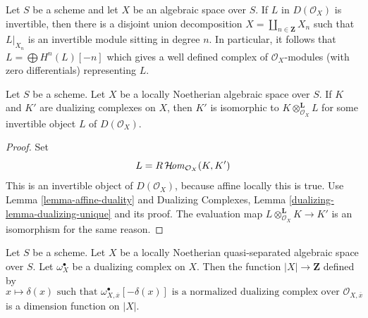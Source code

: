 \medskip\noindent
Let $S$ be a scheme and let $X$ be an algebraic space over $S$.
If $L$ in $D(\mathcal{O}_X)$ is invertible, then there is a
disjoint union decomposition $X = \coprod_{n \in \mathbf{Z}} X_n$
such that $L|_{X_n}$ is an invertible module sitting in degree $n$.
In particular, it follows that $L = \bigoplus H^n(L)[-n]$
which gives a well defined complex of $\mathcal{O}_X$-modules
(with zero differentials) representing $L$.

\begin{lemma}
\label{lemma-dualizing-unique-spaces}
Let $S$ be a scheme.
Let $X$ be a locally Noetherian algebraic space over $S$.
If $K$ and $K'$ are dualizing complexes on $X$, then $K'$
is isomorphic to $K \otimes_{\mathcal{O}_X}^\mathbf{L} L$
for some invertible object $L$ of $D(\mathcal{O}_X)$.
\end{lemma}

\begin{proof}
Set
$$
L = R\mathop{\mathcal{H}\!\mathit{om}}\nolimits_{\mathcal{O}_X}(K, K')
$$
This is an invertible object of $D(\mathcal{O}_X)$, because affine locally
this is true. Use Lemma \ref{lemma-affine-duality} and
Dualizing Complexes, Lemma
\ref{dualizing-lemma-dualizing-unique} and its proof.
The evaluation map $L \otimes_{\mathcal{O}_X}^\mathbf{L} K \to K'$
is an isomorphism for the same reason.
\end{proof}

\begin{lemma}
\label{lemma-dimension-function-scheme}
Let $S$ be a scheme. Let $X$ be a locally Noetherian
quasi-separated algebraic space over $S$.
Let $\omega_X^\bullet$ be a dualizing complex on $X$. Then the function
$|X| \to \mathbf{Z}$ defined by
$$
x \longmapsto \delta(x)\text{ such that }
\omega_{X, \overline{x}}^\bullet[-\delta(x)]
\text{ is a normalized dualizing complex over }
\mathcal{O}_{X, \overline{x}}
$$
is a dimension function on $|X|$.
\end{lemma}

